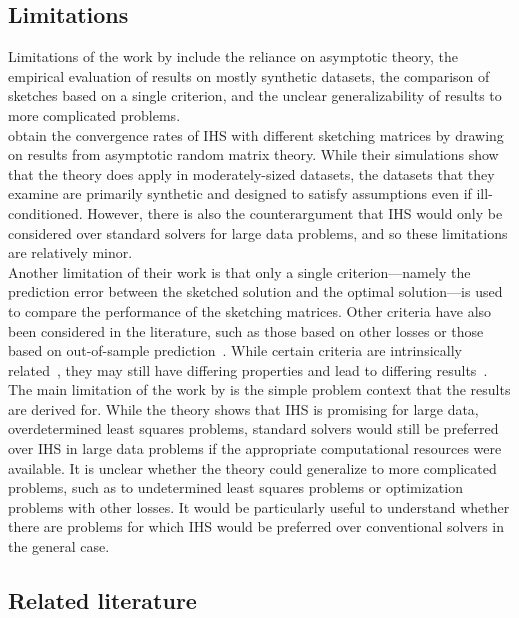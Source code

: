 \subsection{Limitations}

Limitations of the work by \citet{Lacotte:2020} include the reliance on asymptotic theory, the empirical evaluation of results on mostly synthetic datasets, the comparison of sketches based on a single criterion, and the unclear generalizability of results to more complicated problems.
\\

\citet{Lacotte:2020} obtain the convergence rates of IHS with different sketching matrices by drawing on results from asymptotic random matrix theory. While their simulations show that the theory does apply in moderately-sized datasets, the datasets that they examine are primarily synthetic and designed to satisfy assumptions even if ill-conditioned. However, there is also the counterargument that IHS would only be considered over standard solvers for large data problems, and so these limitations are relatively minor.
\\

Another limitation of their work is that only a single criterion---namely the prediction error between the sketched solution and the optimal solution---is used to compare the performance of the sketching matrices. Other criteria have also been considered in the literature, such as those based on other losses or those based on out-of-sample prediction~\citep{Dobriban:2019,Pilanci:2016}. While certain criteria are intrinsically related~\citep{Drineas:2011}, they may still have differing properties and lead to differing results~\citep{Dobriban:2019}.
\\

The main limitation of the work by \citet{Lacotte:2020} is the simple problem context that the results are derived for. While the theory shows that IHS is promising for large data, overdetermined least squares problems, standard solvers would still be preferred over IHS in large data problems if the appropriate computational resources were available. It is unclear whether the theory could generalize to more complicated problems, such as to undetermined least squares problems or optimization problems with other losses. It would be particularly useful to understand whether there are problems for which IHS would be preferred over conventional solvers in the general case.


\subsection{Related literature}

